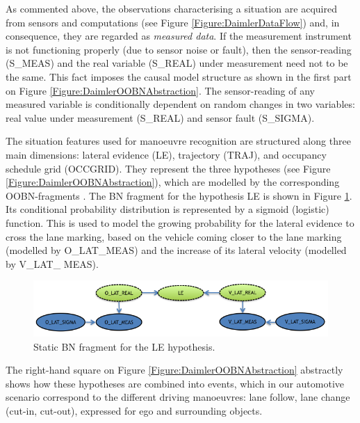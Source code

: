 As commented above, the observations characterising a situation are acquired from sensors and computations (see Figure \ref{Figure:DaimlerDataFlow}) and, in consequence, they are regarded as  \textit{measured data}. If the measurement instrument is not functioning properly (due to sensor noise or fault), then the sensor-reading (S\_MEAS) and the real variable (S\_REAL) under measurement need not to be the same. This fact imposes the causal model structure as shown in the first part on Figure \ref{Figure:DaimlerOOBNAbstraction}. The sensor-reading of any measured variable is conditionally dependent on random changes in two variables: real value under measurement (S\_REAL) and sensor fault (S\_SIGMA).

The situation features used for manoeuvre recognition are structured along three main dimensions: lateral evidence (LE), trajectory (TRAJ), and occupancy schedule grid (OCCGRID). They represent the three hypotheses (see Figure \ref{Figure:DaimlerOOBNAbstraction}), which are modelled by the corresponding OOBN-fragments \cite{kasper2012object}. The BN fragment for the hypothesis LE is shown in Figure \ref{Figure:DaimlerLE}. Its conditional probability distribution is represented by a sigmoid (logistic) function. This is used to model the growing probability for the lateral evidence to cross the lane marking, based on the vehicle coming closer to the lane marking (modelled by O\_LAT\_MEAS) and the increase of its lateral velocity (modelled by V\_LAT\_ MEAS).

\begin{figure}
\begin{center}
\includegraphics[scale=0.58]{./figures/DaimlerLE}
\caption{\label{Figure:DaimlerLE} Static BN fragment for the LE hypothesis.}
\end{center}
\end{figure}

The right-hand square on Figure \ref{Figure:DaimlerOOBNAbstraction} abstractly shows how these hypotheses are combined into events, which in our automotive scenario correspond to the different driving manoeuvres: lane follow, lane change (cut-in, cut-out), expressed for ego and surrounding objects\cite{kasper2012object}.

